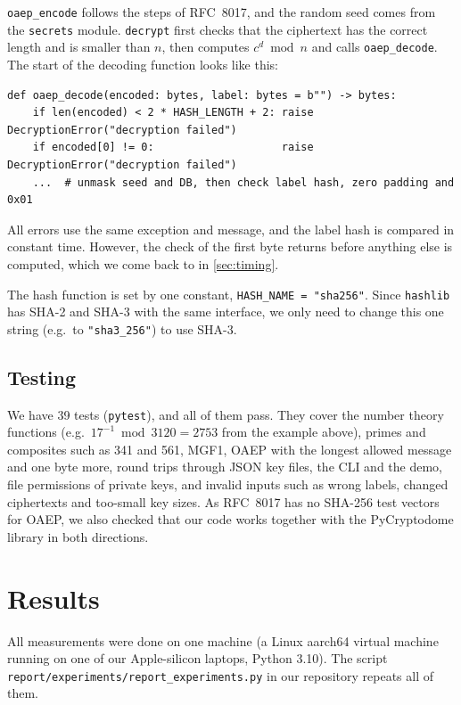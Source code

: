 \documentclass[runningheads]{llncs}
\newcommand{\code}[1]{\texttt{#1}}
\begin{document}
\code{oaep\_encode} follows the steps of RFC~8017, and the random seed
comes from the \code{secrets} module. \code{decrypt} first checks that the ciphertext
has the correct length and is smaller than $n$, then computes $c^d \bmod n$
and calls \code{oaep\_decode}. The start of the decoding function looks like
this:

\begin{lstlisting}
def oaep_decode(encoded: bytes, label: bytes = b"") -> bytes:
    if len(encoded) < 2 * HASH_LENGTH + 2: raise DecryptionError("decryption failed")
    if encoded[0] != 0:                    raise DecryptionError("decryption failed")
    ...  # unmask seed and DB, then check label hash, zero padding and 0x01
\end{lstlisting}

All errors use the same exception and message, and the label hash is
compared in constant time. However, the check of the first byte returns
before anything else is computed, which we come back to in \cref{sec:timing}.

The hash function is set by one constant, \code{HASH\_NAME = "sha256"}.
Since \code{hashlib} has SHA-2 and SHA-3 with the same interface, we only
need to change this one string (e.g.\ to \code{"sha3\_256"}) to use SHA-3.

\subsection{Testing}

We have 39 tests (\code{pytest}), and all of them pass. They cover the
number theory functions (e.g.\ $17^{-1} \bmod 3120 = 2753$ from the example
above), primes and composites such as 341 and 561, MGF1, OAEP with the
longest allowed message and one byte more, round trips through JSON key
files, the CLI and the demo, file permissions of private keys, and invalid
inputs such as wrong labels, changed ciphertexts and too-small key sizes. As
RFC~8017 has no SHA-256 test vectors for OAEP, we also checked that our code
works together with the PyCryptodome library in both directions.

\section{Results}\label{sec:results}

All measurements were done on one machine (a Linux aarch64 virtual machine
running on one of our Apple-silicon laptops, Python 3.10). The script
\code{report/experiments/report\_experiments.py} in our repository repeats
all of them.
\end{document}
